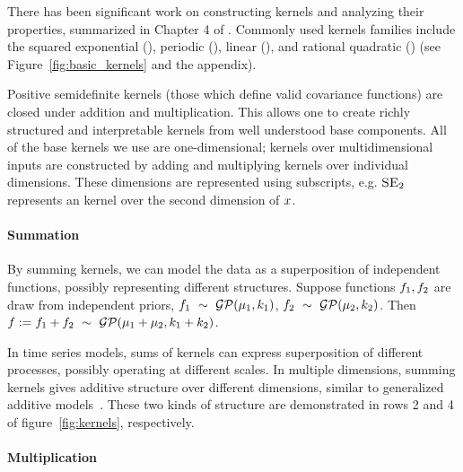 \documentclass[twoside]{article}
\begin{document}
There has been significant work on constructing \gp{} kernels and analyzing their properties, summarized in Chapter 4 of \cite{rasmussen38gaussian}. 
%
Commonly used kernels families include the squared exponential (\kSE), periodic (\kPer), linear (\kLin), and rational quadratic (\kRQ) (see Figure~\ref{fig:basic_kernels} and the appendix).



Positive semidefinite kernels (\ie those which define valid covariance functions) are closed under addition and multiplication.
This allows one to create richly structured and interpretable kernels from well understood base components.
All of the base kernels we use are one-dimensional; kernels over multidimensional inputs are constructed by adding and multiplying kernels over individual dimensions.
These dimensions are represented using subscripts, e.g. $\textsc{SE}_2$ represents an \kSE{} kernel over the second dimension of $x$.
%


\paragraph{Summation}

By summing kernels, we can model the data as a superposition of independent functions, possibly representing different structures.
Suppose functions ${f_1, f_2}$ are draw from independent \gp{} priors, ${f_1 \ \sim\  \mathcal{GP}(\mu_1, k_1)}$, ${f_2 \ \sim\  \mathcal{GP}(\mu_2, k_2)}$.
Then ${f := f_1 + f_2 \ \sim\  \mathcal{GP}(\mu_1 + \mu_2, k_1 + k_2)}$.

In time series models, sums of kernels can express superposition of different processes, possibly operating at different scales.
In multiple dimensions, summing kernels gives additive structure over different dimensions, similar to generalized additive models~\citep{hastie1990generalized}.
These two kinds of structure are demonstrated in rows 2 and 4 of figure~\ref{fig:kernels}, respectively.


\paragraph{Multiplication}
\end{document}
